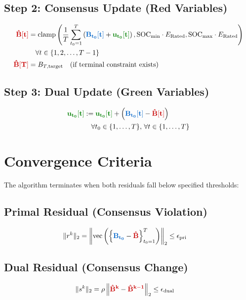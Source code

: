 \documentclass[11pt]{article}
\newcommand{\blueB}[1]{\textcolor{bluevar}{\mathbf{#1}}}      %
\newcommand{\redBhat}[1]{\textcolor{redvar}{\mathbf{#1}}}     %
\newcommand{\greenu}[1]{\textcolor{greenvar}{\mathbf{#1}}}    %
\begin{document}
\subsection{Step 2: Consensus Update (Red Variables)}
\begin{align}
\redBhat{\hat{B}[t]} &= \text{clamp}\left( \frac{1}{T} \sum_{t_0=1}^{T} \left( \blueB{B_{t_0}[t]} + \greenu{u_{t_0}[t]} \right), \text{SOC}_{\min} \cdot E_{\text{Rated}}, \text{SOC}_{\max} \cdot E_{\text{Rated}} \right) \\
&\quad \forall t \in \{1, 2, \ldots, T-1\} \\
\redBhat{\hat{B}[T]} &= B_{T,\text{target}} \quad \text{(if terminal constraint exists)}
\end{align}

\subsection{Step 3: Dual Update (Green Variables)}
\begin{align}
\greenu{u_{t_0}[t]} &:= \greenu{u_{t_0}[t]} + \left( \blueB{B_{t_0}[t]} - \redBhat{\hat{B}[t]} \right) \\
&\quad \forall t_0 \in \{1, \ldots, T\}, \, \forall t \in \{1, \ldots, T\}
\end{align}

\section{Convergence Criteria}

The algorithm terminates when both residuals fall below specified thresholds:

\subsection{Primal Residual (Consensus Violation)}
\begin{align}
\|r^k\|_2 &= \left\| \text{vec}\left( \left\{ \blueB{B_{t_0}} - \redBhat{\hat{B}} \right\}_{t_0=1}^T \right) \right\|_2 \leq \epsilon_{\text{pri}}
\end{align}

\subsection{Dual Residual (Consensus Change)}
\begin{align}
\|s^k\|_2 &= \rho \left\| \redBhat{\hat{B}^k} - \redBhat{\hat{B}^{k-1}} \right\|_2 \leq \epsilon_{\text{dual}}
\end{align}
\end{document}

